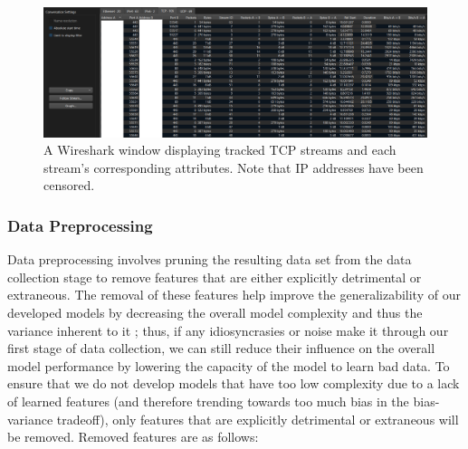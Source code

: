\documentclass[10pt,sigconf,letterpaper,nonacm]{acmart}
\begin{document}
\begin{figure}[h]
  \centering
  \includegraphics[width=.9\pdfpagewidth]{img/wireshark.png}
  \caption{A Wireshark window displaying tracked TCP streams and each stream's corresponding attributes. Note that IP addresses have been censored.}
  \label{fig:wireshark}
\end{figure}

\subsubsection{Data Preprocessing}
Data preprocessing involves pruning the resulting data set from the data collection stage to remove features that are either explicitly detrimental or extraneous.
The removal of these features help improve the generalizability of our developed models by decreasing the overall model complexity and thus the variance inherent to it \cite{introInfo}; thus, if any idiosyncrasies or noise make it through our first stage of data collection, we can still reduce their influence on the overall model performance by lowering the capacity of the model to learn bad data.
To ensure that we do not develop models that have too low complexity due to a lack of learned features (and therefore trending towards too much bias in the bias-variance tradeoff), only features that are explicitly detrimental or extraneous will be removed.
Removed features are as follows:
\end{document}
